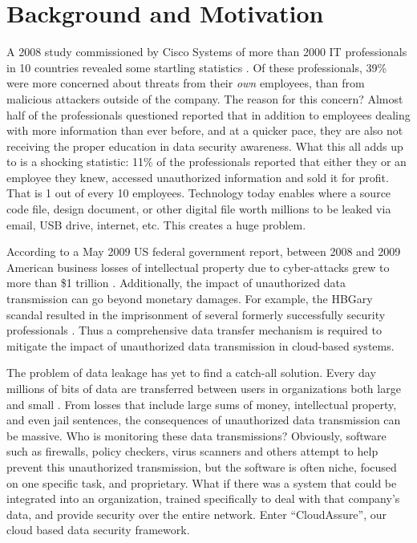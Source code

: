 






\section{Background and Motivation}
\label{sec:introduction}
A 2008 study commissioned by Cisco Systems of more than 2000 IT professionals in
10 countries revealed some startling statistics \autocite{Cisco2008}. Of these professionals,
39\% were more concerned about threats from their \emph{own} employees, than from
malicious attackers outside of the company. The reason for this concern?
Almost half of the professionals questioned reported that in addition to
employees dealing with more information than ever before, and at a quicker
pace, they are also not receiving the proper education in data security
awareness. What this all adds up to is a shocking statistic: 11\% of the
professionals reported that either they or an employee they knew, accessed
unauthorized information and sold it for profit. That is 1 out of every 10
employees. Technology today enables where a source code file, design document, or other
digital file worth millions to be leaked via email, USB drive, internet,
etc. This creates a huge problem.  

According to a May 2009 US federal
government report, between 2008 and 2009 American business losses of intellectual
property due to
cyber-attacks grew to more than \$1 trillion \autocite{Symantec2013}. 
Additionally, the impact of unauthorized data
transmission can go beyond monetary damages. For example, the HBGary
scandal resulted in the
imprisonment of several formerly successfully security professionals
\autocite{Bright2012}.
Thus a comprehensive data transfer mechanism is required to mitigate the
impact of unauthorized data transmission in cloud-based systems.

The problem of data leakage has yet to find a catch-all solution. Every day
millions of bits of data are transferred between users in
organizations both large and small \autocite{Bright2012}. From losses that
include large sums of money, intellectual property, and even jail
sentences, the consequences of unauthorized data transmission can be massive.
Who is monitoring these data transmissions? Obviously,
software such as firewalls, policy checkers, virus scanners and others attempt to help
prevent this unauthorized transmission, but the software is often niche, focused
on one specific task, and proprietary. What if there was a system that could be
integrated into an organization, trained specifically to deal with that company's
data, and provide security over the entire network. Enter ``CloudAssure'', our
cloud based data security framework. 

